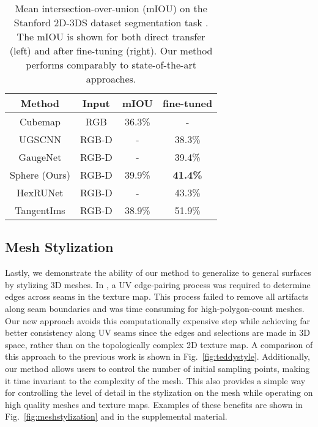 \documentclass[10pt,twocolumn,letterpaper]{article}
\begin{document}
\begin{table}[]
    \centering
    \begin{tabular}{|cc|cc|}
        \hline
        Method & Input & mIOU & fine-tuned \\
        \hline
Cubemap \cite{SelectionConv} & RGB & 36.3\% & - \\
        UGSCNN \cite{Chiyu2019} & RGB-D & - & 38.3\%   \\
        GaugeNet \cite{Cohen2019} & RGB-D & - & 39.4\%   \\
        Sphere (Ours) & RGB-D & 39.9\%  & \textbf{41.4\%}  \\
        HexRUNet \cite{Zhang2019} & RGB-D & - & 43.3\%  \\
        TangentIms \cite{Eder2020} & RGB-D & 38.9\% & 51.9\% \\
        \hline
    \end{tabular}
    \caption{Mean intersection-over-union (mIOU) on the Stanford 2D-3DS dataset segmentation task \cite{Armeni2017}. The mIOU is shown for both direct transfer (left) and after fine-tuning (right). Our method performs comparably to state-of-the-art approaches.}
    \label{tab:segmentation}
\end{table}









\subsection{Mesh Stylization} \label{sec:MeshResults}

Lastly, we demonstrate the ability of our method to generalize to general surfaces by stylizing 3D meshes.
In \cite{SelectionConv}, a UV edge-pairing process was required to determine edges across seams in the texture map. This process failed to remove all artifacts along seam boundaries and was time consuming for high-polygon-count meshes. 
Our 
new 
approach avoids this computationally expensive step while achieving far better consistency along UV seams
since the edges and selections are made in 3D space, rather than on the topologically complex 2D texture map. A comparison of 
this
approach to the previous work is shown in Fig.~\ref{fig:teddystyle}. Additionally, our method allows users to control the number of initial sampling points, making it time invariant to the complexity of the mesh. This also provides a simple way for controlling the level of detail in the stylization on the mesh
while operating on high quality meshes and texture maps.
Examples of these benefits are shown in Fig.~\ref{fig:meshstylization} 
and in the supplemental material. 
\end{document}
